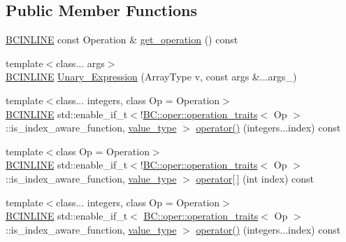 \subsection*{Public Member Functions}
\begin{DoxyCompactItemize}
\item 
\hyperlink{BlackCat__Common_8h_a6699e8b0449da5c0fafb878e59c1d4b1}{B\+C\+I\+N\+L\+I\+NE} const Operation \& \hyperlink{structBC_1_1tensors_1_1exprs_1_1Unary__Expression_a5e01aba866578fb11d4acfd5cec142c9}{get\+\_\+operation} () const 
\item 
{\footnotesize template$<$class... args$>$ }\\\hyperlink{BlackCat__Common_8h_a6699e8b0449da5c0fafb878e59c1d4b1}{B\+C\+I\+N\+L\+I\+NE} \hyperlink{structBC_1_1tensors_1_1exprs_1_1Unary__Expression_add026b1406d5832e258030d77b9bc286}{Unary\+\_\+\+Expression} (Array\+Type v, const args \&...args\+\_\+)
\item 
{\footnotesize template$<$class... integers, class Op  = Operation$>$ }\\\hyperlink{BlackCat__Common_8h_a6699e8b0449da5c0fafb878e59c1d4b1}{B\+C\+I\+N\+L\+I\+NE} std\+::enable\+\_\+if\+\_\+t$<$!\hyperlink{structBC_1_1oper_1_1operation__traits}{B\+C\+::oper\+::operation\+\_\+traits}$<$ Op $>$\+::is\+\_\+index\+\_\+aware\+\_\+function, \hyperlink{structBC_1_1tensors_1_1exprs_1_1Unary__Expression_aeca5642a5f8dcb901d3b91cd60159bf6}{value\+\_\+type} $>$ \hyperlink{structBC_1_1tensors_1_1exprs_1_1Unary__Expression_a16df9b2f23656071d3c0245c2a1c4161}{operator()} (integers...\+index) const 
\item 
{\footnotesize template$<$class Op  = Operation$>$ }\\\hyperlink{BlackCat__Common_8h_a6699e8b0449da5c0fafb878e59c1d4b1}{B\+C\+I\+N\+L\+I\+NE} std\+::enable\+\_\+if\+\_\+t$<$!\hyperlink{structBC_1_1oper_1_1operation__traits}{B\+C\+::oper\+::operation\+\_\+traits}$<$ Op $>$\+::is\+\_\+index\+\_\+aware\+\_\+function, \hyperlink{structBC_1_1tensors_1_1exprs_1_1Unary__Expression_aeca5642a5f8dcb901d3b91cd60159bf6}{value\+\_\+type} $>$ \hyperlink{structBC_1_1tensors_1_1exprs_1_1Unary__Expression_a8b19598ede661491f596f98be0a4358f}{operator\mbox{[}$\,$\mbox{]}} (int index) const 
\item 
{\footnotesize template$<$class... integers, class Op  = Operation$>$ }\\\hyperlink{BlackCat__Common_8h_a6699e8b0449da5c0fafb878e59c1d4b1}{B\+C\+I\+N\+L\+I\+NE} std\+::enable\+\_\+if\+\_\+t$<$ \hyperlink{structBC_1_1oper_1_1operation__traits}{B\+C\+::oper\+::operation\+\_\+traits}$<$ Op $>$\+::is\+\_\+index\+\_\+aware\+\_\+function, \hyperlink{structBC_1_1tensors_1_1exprs_1_1Unary__Expression_aeca5642a5f8dcb901d3b91cd60159bf6}{value\+\_\+type} $>$ \hyperlink{structBC_1_1tensors_1_1exprs_1_1Unary__Expression_a63e5f5a652d34599431853a4cde3a909}{operator()} (integers...\+index) const 

\end{DoxyCompactItemize}
